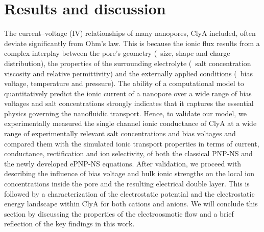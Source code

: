 \documentclass[journal=ancac3,manuscript=article,etalmode=truncate,maxauthors=0,layout=onecolumn]{achemso}
\begin{document}
\section{Results and discussion}\label{sec:results}

The current--voltage (IV) relationships of many nanopores, ClyA included, often deviate significantly from
Ohm's law. This is because the ionic flux results from a complex interplay between the pore's geometry
(\eg~size, shape and charge distribution), the properties of the surrounding electrolyte (\eg~salt
concentration viscosity and relative permittivity) and the externally applied conditions (\eg~bias voltage,
temperature and pressure). The ability of a computational model to quantitatively predict the ionic current of
a nanopore over a wide range of bias voltages and salt concentrations strongly indicates that it captures the
essential physics governing the nanofluidic transport. Hence, to validate our model, we experimentally
measured the single channel ionic conductance of ClyA at a wide range of experimentally relevant salt
concentrations and bias voltages and compared them with the simulated ionic transport properties in terms of
current, conductance, rectification and ion selectivity, of both the classical PNP-NS and the newly developed
ePNP-NS equations. After validation, we proceed with describing the influence of bias voltage and bulk ionic
strengths on the local ion concentrations inside the pore and the resulting electrical double layer. This is
followed by a characterization of the electrostatic potential and the electrostatic energy landscape within
ClyA for both cations and anions. We will conclude this section by discussing the properties of the
electroosmotic flow and a brief reflection of the key findings in this work.
\end{document}
